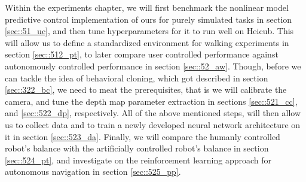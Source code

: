 Within the experiments chapter, we will first benchmark the nonlinear model predictive control implementation of ours for purely simulated tasks in section \ref{sec::51_uc}, and then tune hyperparameters for it to run well on Heicub. This will allow us to define a standardized environment for walking experiments in section \ref{sec::512_pt}, to later compare user controlled performance against autonomously controlled performance in section \ref{sec::52_aw}. Though, before we can tackle the idea of behavioral cloning, which got described in section \ref{sec::322_bc}, we need to meat the prerequisites, that is we will calibrate the camera, and tune the depth map parameter extraction in sections \ref{sec::521_cc}, and \ref{sec::522_dp}, respectively. All of the above mentioned steps, will then allow us to collect data and to train a newly developed neural network architecture on it in section \ref{sec::523_da}. Finally, we will compare the humanly controlled robot's balance with the artificially controlled robot's balance in section \ref{sec::524_pt}, and investigate on the reinforcement learning approach for autonomous navigation in section \ref{sec::525_pp}.